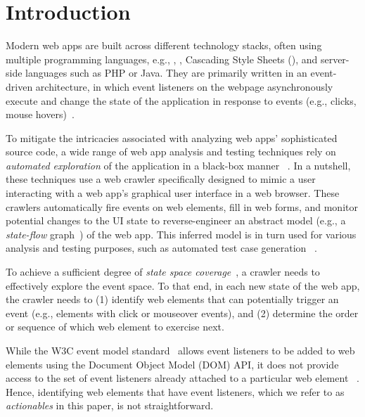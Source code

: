 
\section{Introduction}
\label{sec:introduction}

Modern web apps are built across different technology stacks, 
often using multiple programming languages, e.g., \js, \html,
Cascading Style Sheets (\css), and server-side languages such
as PHP or Java.
They are primarily written in an event-driven architecture,
in which event listeners on the webpage asynchronously
execute and change the state of the application in response to events
(e.g., clicks, mouse hovers)~\cite{Adamsen:2017}.

To mitigate the intricacies associated with analyzing 
web apps' sophisticated source code, 
a wide range of web app analysis and testing techniques
rely on \textit{automated exploration} of the
application in a black-box manner
~\cite{Mesbah:2012:InvariantBasedTesting, MilaniFard:2013:FeedEx,
MilaniFard:2014:LeveragingExistingTests, Mirshokrae:2015:JSFeet,
Duda:2008:AjaxSearchTool, Choudhary:2012:CrossCheck, Mesbah:2011:CrossT,
Thummalapenta:2013:GuidedTestGeneration, dallmeier2014webmate}.
In a nutshell, these techniques use a web crawler specifically designed 
 to mimic a user interacting with 
a web app's graphical user interface in a web browser. 
These crawlers automatically fire events on web elements,
fill in web forms, and monitor potential changes to the UI state 
to reverse-engineer an abstract model 
(e.g., a \textit{state-flow} graph~\cite{Mesbah:2012:Crawljax}) of the web app.
This inferred model is in turn used for various analysis and testing purposes, 
such as automated test case generation
~\cite{Thummalapenta:2013:GuidedTestGeneration, 
MilaniFard:2014:LeveragingExistingTests, Mirshokrae:2015:JSFeet}.

To achieve a sufficient degree of
\textit{state space coverage}~\cite{domcovery:issta14},
a crawler needs to effectively explore the event space. 
To that end, in each new state of the web app,
the crawler needs to
(1) identify web elements that can potentially trigger an event
(e.g., elements with click or mouseover events),
and (2) determine the order or sequence
of which web element to exercise next.

While the W3C event model standard~\cite{pixley2000document}
allows event listeners to be added to web elements
using the Document Object Model (DOM) API,
it does not provide access to the set of event listeners
already attached to a particular web element
~\cite{Andreasen:2017:SurveyOfDynamicAnalysis, Dallmeier:2013:WebMate}.
Hence, identifying web elements that have event listeners,
which we refer to as \emph{actionables} in this paper,
is not straightforward.

